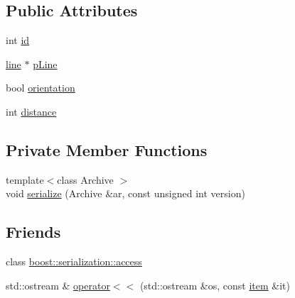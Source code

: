 \subsection*{\-Public \-Attributes}
\begin{DoxyCompactItemize}
\item 
int \hyperlink{classitem_ad073d1c2b50db649b29c7b87d04c4c4c}{id}
\item 
\hyperlink{classline}{line} $\ast$ \hyperlink{classitem_a1b763ddd70a3ce06fddbfec4733520b8}{p\-Line}
\item 
bool \hyperlink{classitem_aeafa2b668217f6960f0d98aa6395cd85}{orientation}
\item 
int \hyperlink{classitem_a1f807e814f5e0068ff09532c5cfd9f1a}{distance}
\end{DoxyCompactItemize}
\subsection*{\-Private \-Member \-Functions}
\begin{DoxyCompactItemize}
\item 
{\footnotesize template$<$class Archive $>$ }\\void \hyperlink{classitem_a542286314f6adae25e17793af39a37df}{serialize} (\-Archive \&ar, const unsigned int version)
\end{DoxyCompactItemize}
\subsection*{\-Friends}
\begin{DoxyCompactItemize}
\item 
class \hyperlink{classitem_ac98d07dd8f7b70e16ccb9a01abf56b9c}{boost\-::serialization\-::access}
\item 
std\-::ostream \& \hyperlink{classitem_ad5cf939a6e6c4b931dafe347ed299894}{operator$<$$<$} (std\-::ostream \&os, const \hyperlink{classitem}{item} \&it)
\end{DoxyCompactItemize}


